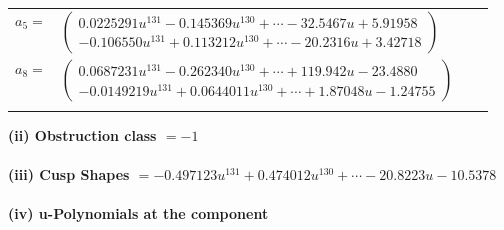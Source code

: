 \documentclass[1p]{elsarticle_modified}
\theoremstyle{definition}
\begin{document}
\begin{tabular}{m{7pt} m{180pt} m{7pt} m{180pt} }
\flushright $a_{5}=$&$\begin{pmatrix}0.0225291 u^{131}-0.145369 u^{130}+\cdots-32.5467 u+5.91958\\-0.106550 u^{131}+0.113212 u^{130}+\cdots-20.2316 u+3.42718\end{pmatrix}$ \\
\flushright $a_{8}=$&$\begin{pmatrix}0.0687231 u^{131}-0.262340 u^{130}+\cdots+119.942 u-23.4880\\-0.0149219 u^{131}+0.0644011 u^{130}+\cdots+1.87048 u-1.24755\end{pmatrix}$\\&\end{tabular}
\flushleft \textbf{(ii) Obstruction class $= -1$}\\~\\
\flushleft \textbf{(iii) Cusp Shapes $= -0.497123 u^{131}+0.474012 u^{130}+\cdots-20.8223 u-10.5378$}\\~\\
\newpage\renewcommand{\arraystretch}{1}
\flushleft \textbf{(iv) u-Polynomials at the component}\newline \\
\end{document}
